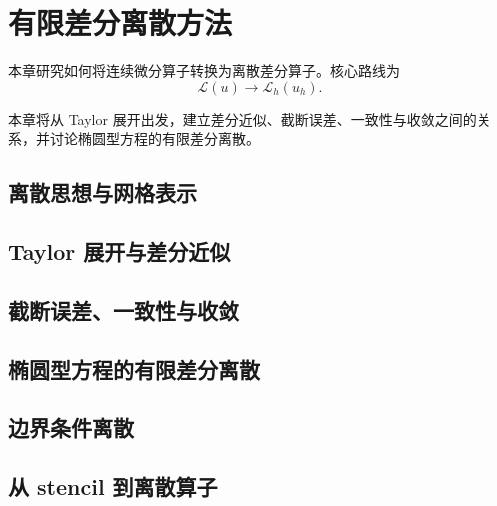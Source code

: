 \chapter{有限差分离散方法}
\label{ch:finite-difference}

本章研究如何将连续微分算子转换为离散差分算子。核心路线为
\[
\mathcal{L}(u)\rightarrow \mathcal{L}_h(u_h).
\]

本章将从 Taylor 展开出发，建立差分近似、截断误差、一致性与收敛之间的关系，并讨论椭圆型方程的有限差分离散。

\section{离散思想与网格表示}

\section{Taylor 展开与差分近似}

\section{截断误差、一致性与收敛}

\section{椭圆型方程的有限差分离散}

\section{边界条件离散}

\section{从 stencil 到离散算子}
